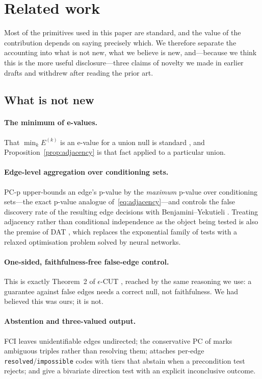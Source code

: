 
\section{Related work}\label{sec:related}

Most of the primitives used in this paper are standard, and the value of the
contribution depends on saying precisely which. We therefore separate the
accounting into what is not new, what we believe is new, and---because we
think this is the more useful disclosure---three claims of novelty we made in
earlier drafts and withdrew after reading the prior art.

\subsection{What is not new}\label{sec:notnew}

\paragraph{The minimum of e-values.} That $\min_k E^{(k)}$ is an e-value for a
union null is standard \citep{vovk2021evalues}, and
Proposition~\ref{prop:adjacency} is that fact applied to a particular union.

\paragraph{Edge-level aggregation over conditioning sets.} PC-p
\citep{strobl2019estimating} upper-bounds an edge's p-value by the
\emph{maximum} p-value over conditioning sets---the exact p-value analogue
of~\eqref{eq:adjacency}---and controls the false discovery rate of the
resulting edge decisions with Benjamini--Yekutieli
\citep{benjamini2001control}. Treating adjacency rather than conditional
independence as the object being tested is also the premise of DAT
\citep{amin2024scalable}, which replaces the exponential family of tests with
a relaxed optimisation problem solved by neural networks.

\paragraph{One-sided, faithfulness-free false-edge control.} This is exactly
Theorem~2 of $\epsilon$-CUT \citep{shaska2025causal}, reached by the same
reasoning we use: a guarantee against false edges needs a correct null, not
faithfulness. We had believed this was ours; it is not.

\paragraph{Abstention and three-valued output.} FCI leaves unidentifiable
edges undirected; the conservative PC of \citet{ramsey2006adjacency} marks
ambiguous triples rather than resolving them; \citet{uehara2026iterative}
attaches per-edge \texttt{resolved}/\texttt{impossible} codes with tiers that
abstain when a precondition test rejects; and \citet{prakash2024diagnostic}
give a bivariate direction test with an explicit inconclusive outcome.

